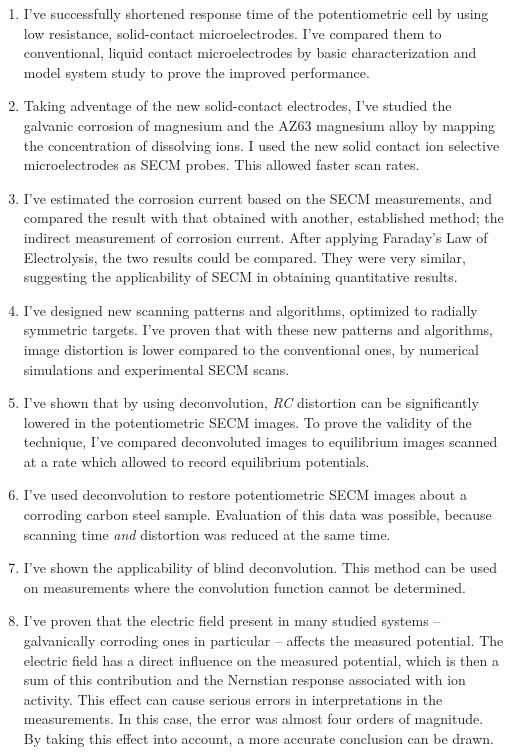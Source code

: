 \begin{enumerate}
\item I've successfully shortened response time of the potentiometric cell by using low resistance, solid-contact microelectrodes.
I've compared them to conventional, liquid contact microelectrodes by basic characterization and model system study to prove the improved performance.

\item Taking adventage of the new solid-contact electrodes, I've studied the galvanic corrosion of magnesium and the AZ63 magnesium alloy by mapping the concentration of dissolving ions.
I used the new solid contact ion selective microelectrodes as SECM probes. This allowed faster scan rates.

\item I've estimated the corrosion current based on the SECM measurements, and compared the result with that obtained with another, established method; the indirect measurement of corrosion current.
After applying Faraday's Law of Electrolysis, the two results could be compared.
They were very similar, suggesting the applicability of SECM in obtaining quantitative results.

\item I've designed new scanning patterns and algorithms, optimized to radially symmetric targets.
I've proven that with these new patterns and algorithms, image distortion is lower compared to the conventional ones, by numerical simulations and experimental SECM scans.

\item I've shown that by using deconvolution, \emph{RC} distortion can be significantly lowered in the potentiometric SECM images.
To prove the validity of the technique, I've compared deconvoluted images to equilibrium images scanned at a rate which allowed to record equilibrium potentials.

\item I've used deconvolution to restore potentiometric SECM images about a corroding carbon steel sample.
Evaluation of this data was possible, because scanning time \emph{and} distortion was reduced at the same time.

\item I've shown the applicability of blind deconvolution.
This method can be used on measurements where the convolution function cannot be determined.

\item I've proven that the electric field present in many studied systems -- galvanically corroding ones in particular -- affects the measured potential.
The electric field has a direct influence on the measured potential, which is then a sum of this contribution and the Nernstian response associated with ion activity.
This effect can cause serious errors in interpretations in the measurements.
In this case, the error was almost four orders of magnitude.
By taking this effect into account, a more accurate conclusion can be drawn.

\end{enumerate}
